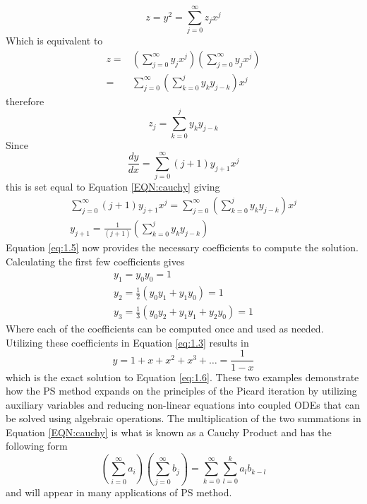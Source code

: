 \documentclass{article}
\begin{document}
    \begin{equation}
        z=y^2=\sum_{j=0}^\infty z_jx^j
    \end{equation}
Which is equivalent to
    \begin{equation}\label{EQN:cauchy}
        \begin{split}
            z=&\left(\sum_{j=0}^\infty y_jx^j\right)\left(\sum_{j=0}^\infty y_jx^j\right)\\
            =&\sum_{j=0}^\infty\left(\sum_{k=0}^jy_ky_{j-k}\right)x^j        
        \end{split}
    \end{equation}
therefore
    \begin{equation}
        z_j=\sum_{k=0}^jy_ky_{j-k}
    \end{equation}
Since  
    \begin{equation}
        \frac{dy}{dx}=\sum_{j=0}^\infty (j+1)y_{j+1}x^j
    \end{equation}
this is set equal to Equation \ref{EQN:cauchy} giving
    \begin{gather}
        \sum_{j=0}^\infty (j+1)y_{j+1}x^j=\sum_{j=0}^\infty\left(\sum_{k=0}^jy_ky_{j-k}\right)x^j\\
        y_{j+1}=\frac{1}{(j+1)}\left(\sum_{k=0}^jy_ky_{j-k}\right)\label{eq:1.5}
    \end{gather}
Equation \ref{eq:1.5} now provides the necessary coefficients to compute the solution. Calculating the first few coefficients gives
    \begin{equation}
        \begin{split}
            y_1=y_0y_0=1\\
            y_2=\frac{1}{2}\left(y_0y_1+y_1y_0\right)=1\\
            y_3=\frac{1}{3}\left(y_0y_2+y_1y_1+y_2y_0 \right)=1
        \end{split}
    \end{equation}
Where each of the coefficients can be computed once and used as needed. Utilizing these coefficients in Equation \ref{eq:1.3} results in
    \begin{equation}
        y=1+x+x^2+x^3+\dots=\frac{1}{1-x}
    \end{equation}
which is the exact solution to Equation \ref{eq:1.6}. These two examples demonstrate how the PS method expands on the principles of the Picard iteration by utilizing auxiliary variables and reducing non-linear equations into coupled ODEs that can be solved using algebraic operations. The multiplication of the two summations in Equation \ref{EQN:cauchy} is what is known as a Cauchy Product and has the following form
    \begin{equation}
        \left(\sum_{i=0}^\infty a_i\right)\left(\sum_{j=0}^\infty b_j\right)=\sum_{k=0}^\infty\sum_{l=0}^ka_lb_{k-l}
    \end{equation}
and will appear in many applications of PS method. \\
\end{document}
